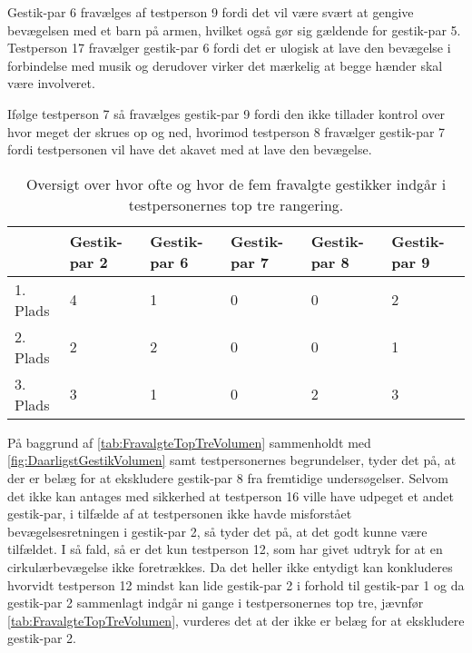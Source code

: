 Gestik-par 6 fravælges af testperson 9 fordi det vil være svært at gengive bevægelsen med et barn på armen, hvilket også gør sig gældende for gestik-par 5. Testperson 17 fravælger gestik-par 6 fordi det er ulogisk at lave den bevægelse i forbindelse med musik og derudover virker det mærkelig at begge hænder skal være involveret. 

Ifølge testperson 7 så fravælges gestik-par 9 fordi den ikke tillader kontrol over hvor meget der skrues op og ned, hvorimod testperson 8 fravælger gestik-par 7 fordi testpersonen vil have det akavet med at lave den bevægelse.
%
\begin{table}[H]
	\centering
	\begin{tabular}{ | p{1.5cm} | p{2.1cm} | p{2.1cm} | p{2.1cm} | p{2.1cm} | p{2.1cm} |}
	\hline
		 & Gestik-par 2 & Gestik-par 6 & Gestik-par 7 & Gestik-par 8 & Gestik-par 9 \\ \hline
		1. Plads & 4 & 1 & 0 & 0 & 2\\ \hline
		2. Plads & 2 & 2 & 0 & 0 & 1\\ \hline
		3. Plads & 3 & 1 & 0 & 2 & 3\\ \hline
	\end{tabular}
	\caption{Oversigt over hvor ofte og hvor de fem fravalgte gestikker indgår i testpersonernes top tre rangering.}
	\label{tab:FravalgteTopTreVolumen}
\end{table}
\noindent
%
På baggrund af \autoref{tab:FravalgteTopTreVolumen} sammenholdt med \autoref{fig:DaarligstGestikVolumen} samt testpersonernes begrundelser, tyder det på, at der er belæg for at ekskludere gestik-par 8 fra fremtidige undersøgelser. Selvom det ikke kan antages med sikkerhed at testperson 16 ville have udpeget et andet gestik-par, i tilfælde af at testpersonen ikke havde misforstået bevægelsesretningen i gestik-par 2, så tyder det på, at det godt kunne være tilfældet. I så fald, så er det kun testperson 12, som har givet udtryk for at en cirkulærbevægelse ikke foretrækkes. Da det heller ikke entydigt kan konkluderes hvorvidt testperson 12 mindst kan lide gestik-par 2 i forhold til gestik-par 1 og da gestik-par 2 sammenlagt indgår ni gange i testpersonernes top tre, jævnfør \autoref{tab:FravalgteTopTreVolumen}, vurderes det at der ikke er belæg for at ekskludere gestik-par 2. 

